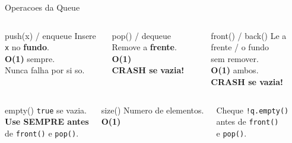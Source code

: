 \documentclass[aspectratio=169,10pt]{beamer}
\begin{document}
\begin{frame}[shrink=2]{Operacoes da Queue}
  \begin{columns}[t]
      \begin{exampleblock}{push(x) / enqueue}
        \footnotesize
        Insere \texttt{x} no \textbf{fundo}.\\[3pt]
        \textbf{O(1)} sempre.\\[3pt]
        Nunca falha por si so.
      \end{exampleblock}
      \begin{alertblock}{pop() / dequeue}
        \footnotesize
        Remove a \textbf{frente}.\\[3pt]
        \textbf{O(1)}\\[3pt]
        \textcolor{gemaRed}{\textbf{CRASH se vazia!}}
      \end{alertblock}
      \begin{block}{front() / back()}
        \footnotesize
        Le a frente / o fundo\\sem remover.\\[3pt]
        \textbf{O(1)} ambos.\\
        \textcolor{gemaRed}{\textbf{CRASH se vazia!}}
      \end{block}
  \end{columns}
  \vspace{0.12cm}
  \begin{columns}[t]
      \begin{block}{empty()}
        \footnotesize
        \texttt{true} se vazia.\\[3pt]
        \textbf{Use SEMPRE antes}\\de \texttt{front()} e \texttt{pop()}.
      \end{block}
      \begin{block}{size()}
        \footnotesize
        Numero de elementos.\\[3pt]
        \textbf{O(1)}
      \end{block}
      \begin{tcolorbox}[caixaVerde,title={Dica de Prova}]
        \footnotesize
        Cheque \texttt{!q.empty()}\\
        antes de \texttt{front()}\\e \texttt{pop()}.

\end{tcolorbox}
\end{columns}
\end{frame}
\end{document}
